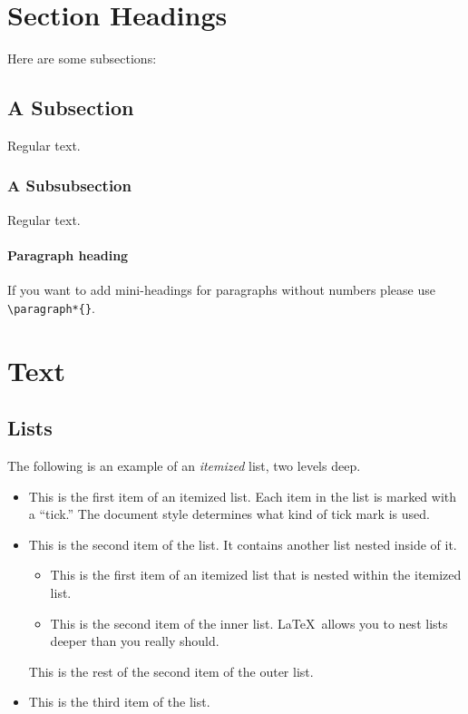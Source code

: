 \documentclass[ecta,nameyear,final,supplement]{econsocart}
\theoremstyle{plain}
\theoremstyle{definition}
\begin{document}
\section{Section Headings}
Here are some subsections:
\subsection{A Subsection}
Regular text.
\subsubsection{A Subsubsection}
Regular text.

\paragraph*{Paragraph heading} If you want to add mini-headings for paragraphs without numbers please use \verb|\paragraph*{}|.

\section{Text}

\subsection{Lists}

The following is an example of an \emph{itemized} list,
two levels deep.
\begin{itemize}
\item
This is the first item of an itemized list.  Each item
in the list is marked with a ``tick.''  The document
style determines what kind of tick mark is used.
\item
This is the second item of the list.  It contains another
list nested inside of it.
\begin{itemize}
\item This is the first item of an itemized list that
is nested within the itemized list.
\item This is the second item of the inner list.  \LaTeX\
allows you to nest lists deeper than you really should.
\end{itemize}
This is the rest of the second item of the outer list.
\item
This is the third item of the list.
\end{itemize}
\end{document}
